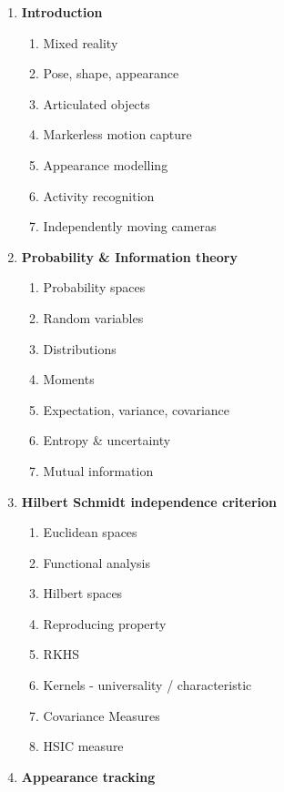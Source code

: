 \begin{enumerate}

\item{\textbf{Introduction}}
  \begin{enumerate}
    \item{Mixed reality}
    \item{Pose, shape, appearance}
    \item{Articulated objects}
    \item{Markerless motion capture}
    \item{Appearance modelling}
    \item{Activity recognition}
    \item{Independently moving cameras}
  \end{enumerate}

\item{\textbf{Probability \& Information theory}}
  \begin{enumerate}
  \item{Probability spaces}
  \item{Random variables}
  \item{Distributions}
  \item{Moments}
  \item{Expectation, variance, covariance}
  \item{Entropy \& uncertainty}
  \item{Mutual information}
  \end{enumerate}

\item{\textbf{Hilbert Schmidt independence criterion}}
  \begin{enumerate}
    \item{Euclidean spaces}
    \item{Functional analysis}
    \item{Hilbert spaces}
    \item{Reproducing property}
    \item{RKHS}
    \item{Kernels - universality / characteristic}
    \item{Covariance Measures}
    \item{HSIC measure}
  \end{enumerate}

\item{\textbf{Appearance tracking}}


\end{enumerate}
